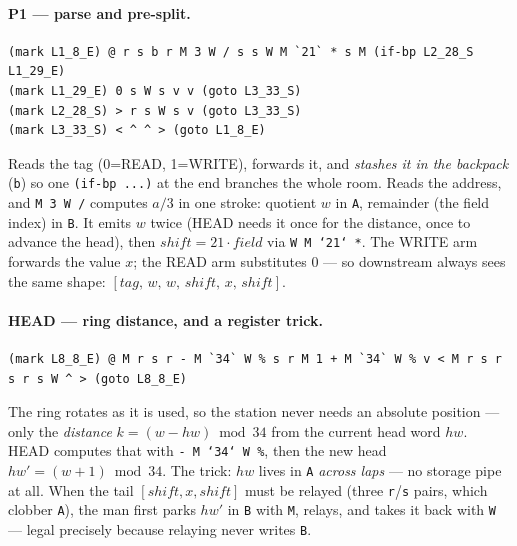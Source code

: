 \documentclass[11pt,a4paper]{article}
\newcommand{\op}[1]{\texttt{#1}}
\begin{document}
\paragraph{P1 --- parse and pre-split.}
{\footnotesize
\begin{verbatim}
(mark L1_8_E) @ r s b r M 3 W / s s W M `21` * s M (if-bp L2_28_S L1_29_E)
(mark L1_29_E) 0 s W s v v (goto L3_33_S)
(mark L2_28_S) > r s W s v (goto L3_33_S)
(mark L3_33_S) < ^ ^ > (goto L1_8_E)
\end{verbatim}
}
Reads the tag (0=READ, 1=WRITE), forwards it, and \emph{stashes it in the
backpack} (\op{b}) so one \texttt{(if-bp ...)} at the end branches the whole
room. Reads the address, and \op{M 3 W /} computes $a/3$ in one stroke:
quotient $w$ in \op{A}, remainder (the field index) in \op{B}. It emits $w$
twice (HEAD needs it once for the distance, once to advance the head), then
$\mathit{shift}=21\cdot\mathit{field}$ via \op{W M `21` *}. The WRITE arm
forwards the value $x$; the READ arm substitutes 0 --- so downstream always
sees the same shape: $[\mathit{tag},\,w,\,w,\,\mathit{shift},\,x,\,\mathit{shift}]$.

\paragraph{HEAD --- ring distance, and a register trick.}
{\footnotesize
\begin{verbatim}
(mark L8_8_E) @ M r s r - M `34` W % s r M 1 + M `34` W % v < M r s r s r s W ^ > (goto L8_8_E)
\end{verbatim}
}
The ring rotates as it is used, so the station never needs an absolute
position --- only the \emph{distance} $k=(w-\mathit{hw})\bmod 34$ from the
current head word $\mathit{hw}$. HEAD computes that with
\op{-\,M\,`34`\,W\,\%}, then the new head $\mathit{hw}'=(w+1)\bmod 34$.
The trick: $\mathit{hw}$ lives in \op{A} \emph{across laps} --- no storage
pipe at all. When the tail $[\mathit{shift},x,\mathit{shift}]$ must be
relayed (three \op{r}/\op{s} pairs, which clobber \op{A}), the man first
parks $\mathit{hw}'$ in \op{B} with \op{M}, relays, and takes it back with
\op{W} --- legal precisely because relaying never writes \op{B}.
\end{document}

